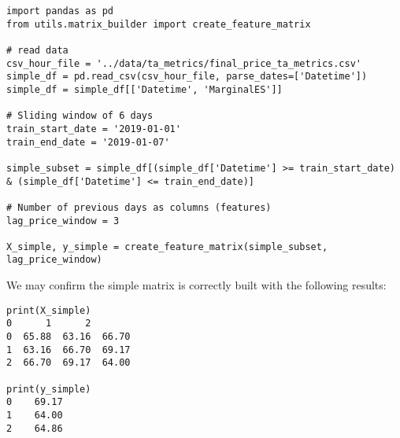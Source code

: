 \documentclass[12pt]{report} %
\begin{document}
\begin{lstlisting}
import pandas as pd
from utils.matrix_builder import create_feature_matrix

# read data
csv_hour_file = '../data/ta_metrics/final_price_ta_metrics.csv'
simple_df = pd.read_csv(csv_hour_file, parse_dates=['Datetime'])
simple_df = simple_df[['Datetime', 'MarginalES']]

# Sliding window of 6 days
train_start_date = '2019-01-01'
train_end_date = '2019-01-07'

simple_subset = simple_df[(simple_df['Datetime'] >= train_start_date) & (simple_df['Datetime'] <= train_end_date)]

# Number of previous days as columns (features)
lag_price_window = 3

X_simple, y_simple = create_feature_matrix(simple_subset, lag_price_window)
\end{lstlisting}

We may confirm the simple matrix is correctly built with the following results:
\begin{small}
\begin{verbatim}
print(X_simple)
0      1      2
0  65.88  63.16  66.70
1  63.16  66.70  69.17
2  66.70  69.17  64.00

print(y_simple)
0    69.17
1    64.00
2    64.86
\end{verbatim}
\end{small}
\end{document}
